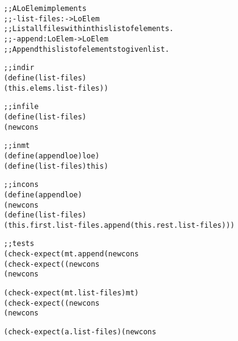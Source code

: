 \documentclass[12pt]{article}                   %
\newenvironment{solution}{\color{Red}}{}
\begin{document}
\begin{problem}
\begin{solution}
\begin{alltt}
;; A LoElem implements
;; - list-files : -> LoElem
;;   List all files within this list of elements.
;; - append : LoElem -> LoElem
;;   Append this list of elements to given list.

;; in dir%
(define (list-files)
  (this . elems . list-files))

;; in file%
(define (list-files)
  (new cons% this (new mt%)))

;; in mt%
(define (append loe) loe)
(define (list-files) this)

;; in cons%
(define (append loe)
  (new cons% (this . first) (this . rest . append loe)))
(define (list-files)
  (this . first . list-files . append (this . rest . list-files)))


;; tests
(check-expect (mt . append (new cons% a mt)) (new cons% a mt))
(check-expect ((new cons% a mt) . append (new cons% b mt))
              (new cons% a (new cons% b mt)))

(check-expect (mt . list-files) mt)
(check-expect ((new cons% a (new cons% b mt)) . list-files)
              (new cons% a (new cons% b mt)))

(check-expect (a . list-files) (new cons% a mt))
\end{alltt}
\end{solution}

\end{problem}
\newpage


\end{document}
